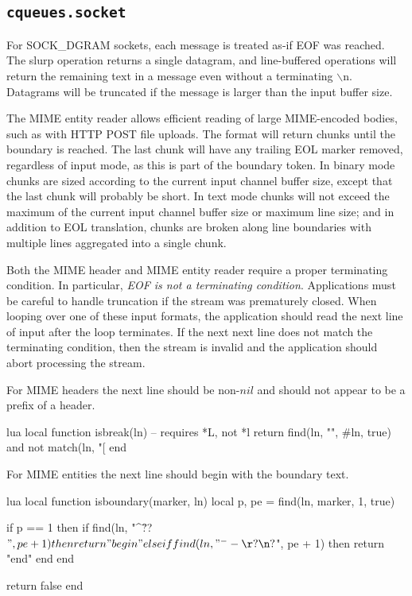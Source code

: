 \documentclass[11pt, oneside]{memoir}
\newcommand*{\lf}[0]{$\backslash$n\xspace}
\newcounter{toccols}
\newenvironment{Module}[1]{
	\subsection{\texttt{#1}}
	\addtocontents{toc}{
		\protect\begin{multicols}{\value{toccols}}
	}
}{
	\addtocontents{toc}{\protect\end{multicols}}
}
\begin{document}
\begin{Module}{cqueues.socket}
For SOCK\_DGRAM sockets, each message is treated as-if EOF was reached. The slurp operation returns a single datagram, and line-buffered operations will return the remaining text in a message even without a terminating \lf. Datagrams will be truncated if the message is larger than the input buffer size.

The MIME entity reader allows efficient reading of large MIME-encoded bodies, such as with HTTP POST file uploads. The format will return chunks until the boundary is reached. The last chunk will
have any trailing EOL marker removed, regardless of input mode, as this is part of the boundary token. In binary mode chunks are sized according to the current input channel buffer size, except that the last chunk will probably be short. In text mode chunks will not exceed the maximum of the current input channel buffer size or maximum line size; and in addition to EOL translation, chunks are broken along line boundaries with multiple lines aggregated into a single chunk.

Both the MIME header and MIME entity reader require a proper terminating condition. In particular, \emph{EOF is not a terminating condition}. Applications must be careful to handle truncation if the stream was prematurely closed. When looping over one of these input formats, the application should read the next line of input after the loop terminates. If the next next line does not match the terminating condition, then the stream is invalid and the application should abort processing the stream.

For MIME headers the next line should be non-$nil$ and should not appear to be a prefix of a header.

\begin{example}{lua}
local function isbreak(ln) -- requires *L, not *l
	return find(ln, "\n", #ln, true) and not match(ln, "[%
end
\end{example}

For MIME entities the next line should begin with the boundary text.

\begin{example}{lua}
local function isboundary(marker, ln)
	local p, pe = find(ln, marker, 1, true)

	if p == 1 then
		if find(ln, "^\r?\n?$", pe + 1) then
			return "begin"
		elseif find(ln, "^--\r?\n?$", pe + 1) then
			return "end" 
		end
	end

	return false
end
\end{example}



\end{Module}
\end{document}
